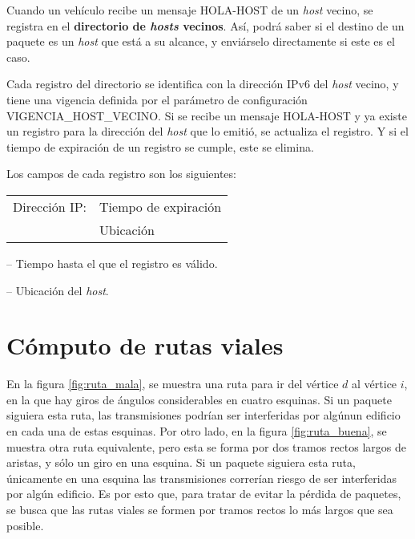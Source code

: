 \begin{sloppypar}
Cuando un vehículo recibe un mensaje \mbox{HOLA-HOST} de un \textit{host}
vecino, se registra en el \textbf{directorio de \textit{hosts} vecinos}. Así,
podrá saber si el destino de un paquete es un \textit{host} que está a su
alcance, y enviárselo directamente si este es el caso.
\end{sloppypar}

\begin{sloppypar}
Cada registro del directorio se identifica con la dirección IPv6 del
\textit{host} vecino, y tiene una vigencia definida por el parámetro de
configuración \mbox{VIGENCIA\_HOST\_VECINO}. Si se recibe un mensaje
\mbox{HOLA-HOST} y ya existe un registro para la dirección del \textit{host} que
lo emitió, se actualiza el registro. Y si el tiempo de expiración de un registro
se cumple, este se elimina.
\end{sloppypar}

Los campos de cada registro son los siguientes:

\begin{center}
\begin{tabular}{ r l }
Dirección IP: & Tiempo de expiración \\
& Ubicación \\
\end{tabular}
\end{center}

 -- Tiempo hasta el que el registro es válido.

 -- Ubicación del \textit{host}.

\section{Cómputo de rutas viales}
\label{subsec:computo_rutas_viales}

En la figura \ref{fig:ruta_mala}, se muestra una ruta para ir del vértice $d$
al vértice $i$, en la que hay giros de ángulos considerables en cuatro esquinas.
Si un paquete siguiera esta ruta, las transmisiones podrían ser interferidas por
algúnun edificio en cada una de estas esquinas. Por otro lado, en la figura
\ref{fig:ruta_buena}, se muestra otra ruta equivalente, pero esta se forma por
dos tramos rectos largos de aristas, y sólo un giro en una esquina. Si un
paquete siguiera esta ruta, únicamente en una esquina las transmisiones
correrían riesgo de ser interferidas por algún edificio. Es por esto que,
para tratar de evitar la pérdida de paquetes, se busca que las rutas viales se
formen por tramos rectos lo más largos que sea posible.

